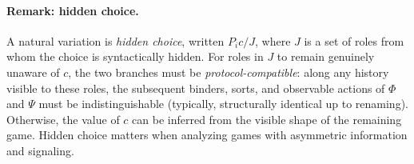 \paragraph{Remark: hidden choice.}
A natural variation is \emph{hidden choice}, written $P_i c / J$, where $J$ is a set of roles from whom the choice is syntactically hidden.
For roles in $J$ to remain genuinely unaware of $c$, the two branches must be \emph{protocol-compatible}: along any history visible to these roles, the subsequent binders, sorts, and observable actions of $\Phi$ and $\Psi$ must be indistinguishable (typically, structurally identical up to renaming).
Otherwise, the value of $c$ can be inferred from the visible shape of the remaining game.
Hidden choice matters when analyzing games with asymmetric information and signaling.
